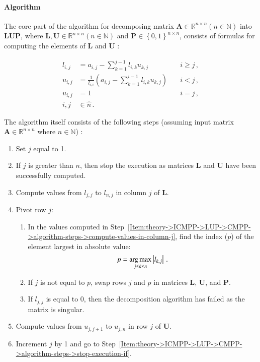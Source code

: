 \paragraph{Algorithm} The core part of the algorithm for decomposing matrix $\mathbf{A} \in \mathbb{R}^{n \times n} \left(n \in \mathbb{N}\right)$ into $\mathbf{LUP}$, where $\mathbf{L}, \mathbf{U} \in \mathbb{R}^{n \times n} \left(n \in \mathbb{N}\right)$ and $\mathbf{P} \in \left\{0,1\right\}^{n \times n}$, consists of formulas for computing the elements of $\mathbf{L}$ and $\mathbf{U}$ \cite{Press2007}:

\begin{align}
	l_{i,j} & = a_{i,j} - \sum_{k=1}^{j-1}l_{i,k}u_{k,j} 								    & \quad i \geq j\,, \label{Equation:theory->ICMPP->LUP->CMPP->lij} \\
	u_{i,j} & = \frac{1}{l_{i,i}} \left ( a_{i,j} - \sum_{k=1}^{i-1}l_{i,k}u_{k,j} \right ) & \quad i < j\,, 	\label{Equation:theory->ICMPP->LUP->CMPP->uij} \\
	u_{i,j} & = 1 																	  	    & \quad i = j \nonumber\,, 	\\
	i,j 	& \in \widehat{n} \nonumber\,.
\end{align}

The algorithm itself consists of the following steps (assuming input matrix $\mathbf{A} \in \mathbb{R}^{n \times n}$ where $n \in \mathbb{N}$) \cite{Press2007, Forsythe1960}:

\begin{enumerate}
	\item Set $j$ equal to 1.
	\item \label{Item:theory->ICMPP->LUP->CMPP->algorithm-steps->stop-execution-if}
		If $j$ is greater than $n$, then stop the execution as matrices $\mathbf{L}$ and $\mathbf{U}$ have been successfully computed.
	\item \label{Item:theory->ICMPP->LUP->CMPP->algorithm-steps->compute-values-in-column-j}
		Compute values from $l_{j,j}$ to $l_{n,j}$ in column $j$ of $\mathbf{L}$.
	\item \label{Item:theory->ICMPP->LUP->CMPP->algorithm-steps->pivot-row-j}
		Pivot row $j$:
	\begin{enumerate}
		\item In the values computed in Step~\ref{Item:theory->ICMPP->LUP->CMPP->algorithm-steps->compute-values-in-column-j}, find the index ($p$) of the element largest in absolute value:
		\begin{equation}
			p = \operatorname*{arg\,max}_{j \leq k \leq n} \left| l_{k, j} \right| \,.
		\end{equation}
		\item If $j$ is not equal to $p$, swap rows $j$ and $p$ in matrices $\mathbf{L}$, $\mathbf{U}$, and $\mathbf{P}$.
		\item If $l_{j,j}$ is equal to 0, then the decomposition algorithm has failed as the matrix is singular.
	\end{enumerate}
	\item Compute values from $u_{j,j+1}$ to $u_{j,n}$ in row $j$ of $\mathbf{U}$.
	\item Increment $j$ by 1 and go to Step~\ref{Item:theory->ICMPP->LUP->CMPP->algorithm-steps->stop-execution-if}.
\end{enumerate}

